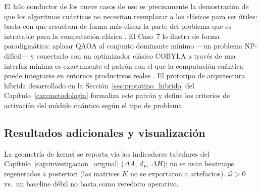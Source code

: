 El hilo conductor de los nueve casos de uso es precisamente la demostración de que los algoritmos cuánticos no necesitan reemplazar a los clásicos para ser útiles: basta con que resuelvan de forma más eficaz la parte del problema que es intratable para la computación clásica \citep{biamonte2017}. El Caso~7 lo ilustra de forma paradigmática: aplicar QAOA al conjunto dominante mínimo ---un problema NP-difícil--- y conectarlo con un optimizador clásico COBYLA a través de una interfaz mínima es exactamente el patrón con el que la computación cuántica puede integrarse en entornos productivos reales \citep{farhi2014}. El prototipo de arquitectura híbrida desarrollado en la Sección~\ref{sec:prototipo_hibrido} del Capítulo~\ref{cap:metodologia} formaliza este patrón y define los criterios de activación del módulo cuántico según el tipo de problema.

\subsection{Resultados adicionales y visualización}

La geometría de kernel se reporta vía los indicadores tabulares del Capítulo~\ref{cap:investigacion_original} ($\Delta A$, $d_F$, $\Delta H$); no se usan heatmaps regenerados a posteriori (las matrices $K$ no se exportaron a artefactos). $\mathcal{Q}>0$ vs.\ un baseline débil no basta como veredicto operativo.


